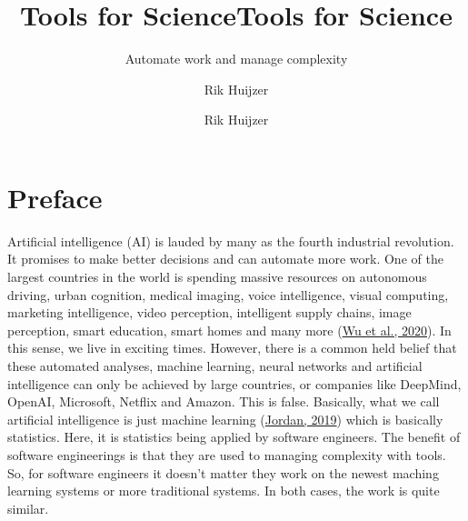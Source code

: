 \documentclass[
  14pt
  american,
  paper=a4,
  ,captions=tableheading
]{scrbook}
\title{Tools for Science}
\subtitle{Automate work and manage complexity}
\author{Rik Huijzer}
\date{}
\title{Tools for Science}
\author{Rik Huijzer}
\date{}
\begin{document}
\begin{titlepage}
\newcommand{\colorRule}[3][black]{\textcolor[HTML]{#1}{\rule{#2}{#3}}}
\end{titlepage}
\restoregeometry




{
\hypersetup{linkcolor=}
\setcounter{tocdepth}{2}
\tableofcontents
}
\hypertarget{sec:preface}{%
\chapter{Preface}\label{sec:preface}}

Artificial intelligence (AI) is lauded by many as the fourth industrial
revolution. It promises to make better decisions and can automate more
work. One of the largest countries in the world is spending massive
resources on autonomous driving, urban cognition, medical imaging, voice
intelligence, visual computing, marketing intelligence, video
perception, intelligent supply chains, image perception, smart
education, smart homes and many more
(\protect\hyperlink{ref-wu2020towards}{Wu et al., 2020}). In this sense,
we live in exciting times. However, there is a common held belief that
these automated analyses, machine learning, neural networks and
artificial intelligence can only be achieved by large countries, or
companies like DeepMind, OpenAI, Microsoft, Netflix and Amazon. This is
false. Basically, what we call artificial intelligence is just machine
learning (\protect\hyperlink{ref-jordan2019artificial}{Jordan, 2019})
which is basically statistics. Here, it is statistics being applied by
software engineers. The benefit of software engineerings is that they
are used to managing complexity with tools. So, for software engineers
it doesn't matter they work on the newest maching learning systems or
more traditional systems. In both cases, the work is quite similar.
\end{document}
